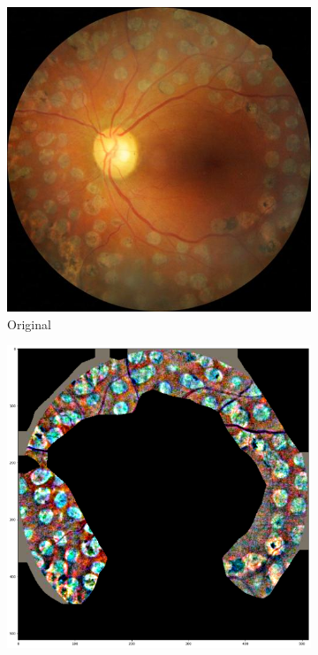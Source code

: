 \begin{figure}[htb]
     \begin{subfigure}[b]{0.24\textwidth}
         \centering
         \includegraphics[width=\textwidth,height=\textwidth]{figures/chapter6/others/1707_left.jpeg}
         \caption{Original}
    \end{subfigure}
    \hfill
    \begin{subfigure}[b]{0.24\textwidth}
         \centering
         \includegraphics[width=\textwidth,height=\textwidth]{figures/chapter6/others/anchor.png}

\end{subfigure}
\end{figure}
